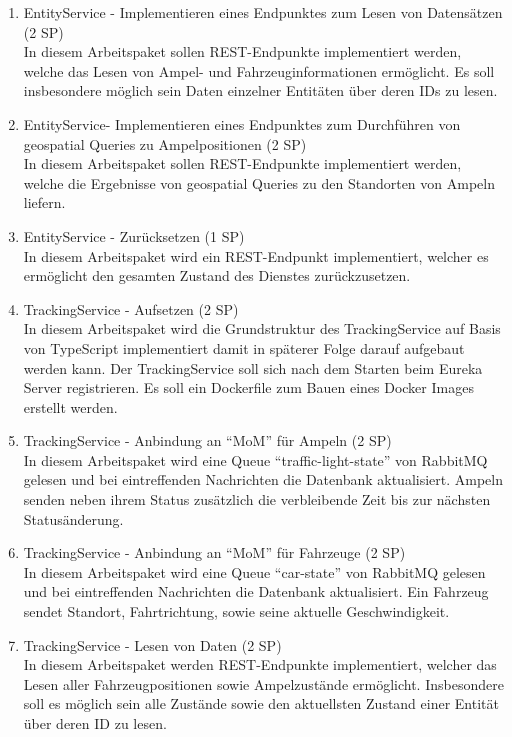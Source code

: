 \begin{enumerate}
  \item EntityService - Implementieren eines Endpunktes zum Lesen von Datensätzen (2 SP)\\
  		In diesem Arbeitspaket sollen REST-Endpunkte implementiert werden, welche das Lesen von Ampel- und Fahrzeuginformationen ermöglicht.
  		Es soll insbesondere möglich sein Daten einzelner Entitäten über deren IDs zu lesen.
  \item EntityService- Implementieren eines Endpunktes zum Durchführen von geospatial Queries zu Ampelpositionen (2 SP)\\
  		In diesem Arbeitspaket sollen REST-Endpunkte implementiert werden, welche die Ergebnisse von geospatial Queries zu den Standorten von Ampeln liefern.
  \item EntityService - Zurücksetzen (1 SP)\\
 		In diesem Arbeitspaket wird ein REST-Endpunkt implementiert, welcher es ermöglicht den gesamten Zustand des Dienstes zurückzusetzen.
  \item TrackingService - Aufsetzen (2 SP)\\
  		In diesem Arbeitspaket wird die Grundstruktur des TrackingService auf Basis von TypeScript implementiert damit in späterer Folge darauf aufgebaut werden kann.
  		Der TrackingService soll sich nach dem Starten beim Eureka Server registrieren.
  		Es soll ein Dockerfile zum Bauen eines Docker Images erstellt werden.
  \item TrackingService - Anbindung an \enquote{MoM} für Ampeln (2 SP)\\
  		In diesem Arbeitspaket wird eine Queue \enquote{traffic-light-state} von RabbitMQ gelesen und bei eintreffenden Nachrichten die Datenbank aktualisiert.
  		Ampeln senden neben ihrem Status zusätzlich die verbleibende Zeit bis zur nächsten Statusänderung.
  \item TrackingService - Anbindung an \enquote{MoM} für Fahrzeuge (2 SP)\\
  		In diesem Arbeitspaket wird eine Queue \enquote{car-state} von RabbitMQ gelesen und bei eintreffenden Nachrichten die Datenbank aktualisiert.
  		Ein Fahrzeug sendet Standort, Fahrtrichtung, sowie seine aktuelle Geschwindigkeit.
  \item TrackingService - Lesen von Daten (2 SP)\\
  		In diesem Arbeitspaket werden REST-Endpunkte implementiert, welcher das Lesen aller Fahrzeugpositionen sowie Ampelzustände ermöglicht.
  		Insbesondere soll es möglich sein alle Zustände sowie den aktuellsten Zustand einer Entität über deren ID zu lesen.

\end{enumerate}
